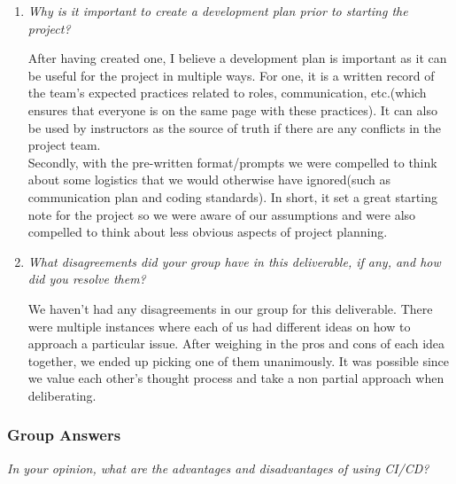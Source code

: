 \documentclass{article}
\begin{document}
\begin{enumerate}
  \item \textit{Why is it important to create a development plan prior to starting the project?}

   After having created one, I believe a development plan is important as it can be useful for the project in multiple ways. For one, it is a written record of the team's expected practices related to roles, communication, etc.(which ensures that everyone is on the same page with these practices). It can also be used by instructors as the source of truth if there are any conflicts in the project team.\\

   Secondly, with the pre-written format/prompts we were compelled to think about some logistics that we would otherwise have ignored(such as communication plan and coding standards). In short, it set a great starting note for the project so we were aware of our assumptions and were also compelled to think about less obvious aspects of project planning.

  \item \textit{What disagreements did your group have in this deliverable, if any, and how did you resolve them?}

  We haven’t had any disagreements in our group for this deliverable. There were multiple instances where each of us had different ideas on how to approach a particular issue. After weighing in the pros and cons of each idea together, we ended up picking one of them unanimously. It was possible since we value each other’s thought process and take a non partial approach when deliberating.

\end{enumerate}

\subsubsection*{Group Answers}

\textit{In your opinion, what are the advantages and disadvantages of using CI/CD?}
  
\end{document}
